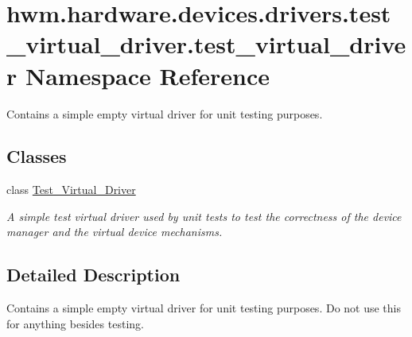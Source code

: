 \hypertarget{namespacehwm_1_1hardware_1_1devices_1_1drivers_1_1test__virtual__driver_1_1test__virtual__driver}{\section{hwm.\-hardware.\-devices.\-drivers.\-test\-\_\-virtual\-\_\-driver.\-test\-\_\-virtual\-\_\-driver Namespace Reference}
\label{namespacehwm_1_1hardware_1_1devices_1_1drivers_1_1test__virtual__driver_1_1test__virtual__driver}
}


Contains a simple empty virtual driver for unit testing purposes.  


\subsection*{Classes}
\begin{DoxyCompactItemize}
\item 
class \hyperlink{classhwm_1_1hardware_1_1devices_1_1drivers_1_1test__virtual__driver_1_1test__virtual__driver_1_1_test___virtual___driver}{Test\-\_\-\-Virtual\-\_\-\-Driver}
\begin{DoxyCompactList}\small\item\em A simple test virtual driver used by unit tests to test the correctness of the device manager and the virtual device mechanisms. \end{DoxyCompactList}\end{DoxyCompactItemize}


\subsection{Detailed Description}
Contains a simple empty virtual driver for unit testing purposes. Do not use this for anything besides testing. 